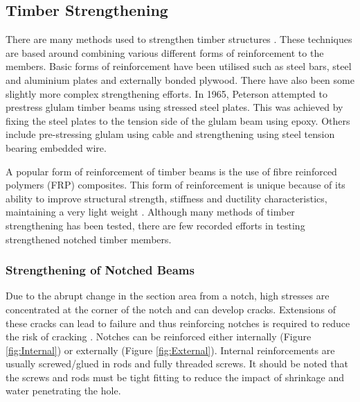 \documentclass[11pt,a4paper]{article}
\numberwithin{equation}{subsection}
\begin{document}
\subsection{Timber Strengthening}
There are many methods used to strengthen timber structures \cite{plevris_frp-reinforced_1992}. These techniques are based around combining various different forms of reinforcement to the members. Basic forms of reinforcement have been utilised such as steel bars, steel and aluminium plates and externally bonded plywood. There have also been some slightly more complex strengthening efforts. In 1965, Peterson \cite{leicester_size_1969} attempted to prestress glulam timber beams using stressed steel plates. This was achieved by fixing the steel plates to the tension side of the glulam beam using epoxy. Others include pre-stressing glulam using cable and strengthening using steel tension bearing embedded wire. 

\vspace*{\baselineskip}

\noindent
A popular form of reinforcement of timber beams is the use of fibre reinforced polymers (FRP) composites. This form of reinforcement is unique because of its ability to improve structural strength, stiffness and ductility characteristics, maintaining a very light weight \cite{plevris_frp-reinforced_1992}. Although many methods of timber strengthening has been tested, there are few recorded efforts in testing strengthened notched timber members. 


\subsubsection{Strengthening of Notched Beams}
Due to the abrupt change in the section area from a notch, high stresses are concentrated at the corner of the notch and can develop cracks. Extensions of these cracks can lead to failure and thus reinforcing notches is required to reduce the risk of cracking \cite{jockwer_structural_2014}. Notches can be reinforced either internally (Figure \ref{fig:Internal}) or externally (Figure \ref{fig:External}). Internal reinforcements are usually screwed/glued in rods and fully threaded screws. It should be noted that the screws and rods must be tight fitting to reduce the impact of shrinkage and water penetrating the hole\cite{jockwer_structural_2014,fawwaz_structural_2012}. 
\vspace*{\baselineskip}
\end{document}
